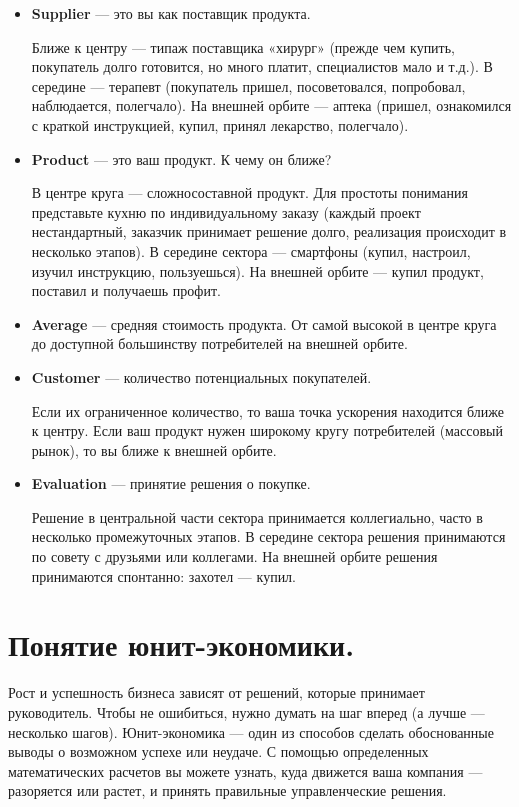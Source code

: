 \documentclass[11pt]{article}
\theoremstyle{plain} %
\theoremstyle{definition} %
\theoremstyle{remark} %
\begin{document}
\begin{itemize}
	\item \textbf{Supplier} --- это вы как поставщик продукта.

	Ближе к центру — типаж поставщика «хирург» (прежде чем купить, покупатель долго готовится, но много платит, специалистов мало и т.д.). В середине — терапевт (покупатель пришел, посоветовался, попробовал, наблюдается, полегчало). На внешней орбите — аптека (пришел, ознакомился с краткой инструкцией, купил, принял лекарство, полегчало).
	\item \textbf{Product} --- это ваш продукт. К чему он ближе?

	В центре круга — сложносоставной продукт. Для простоты понимания представьте кухню по индивидуальному заказу (каждый проект нестандартный, заказчик принимает решение долго, реализация происходит в несколько этапов). В середине сектора — смартфоны (купил, настроил, изучил инструкцию, пользуешься). На внешней орбите — купил продукт, поставил и получаешь профит.
	\item \textbf{Average} --- средняя стоимость продукта. От самой высокой в центре круга до доступной большинству потребителей на внешней орбите.
	\item \textbf{Customer} --- количество потенциальных покупателей.

	Если их ограниченное количество, то ваша точка ускорения находится ближе к центру. Если ваш продукт нужен широкому кругу потребителей (массовый рынок), то вы ближе к внешней орбите.
	\item \textbf{Evaluation} --- принятие решения о покупке.

	Решение в центральной части сектора принимается коллегиально, часто в несколько промежуточных этапов. В середине сектора решения принимаются по совету с друзьями или коллегами. На внешней орбите решения принимаются спонтанно: захотел — купил.
\end{itemize}

\newpage

\section{Понятие юнит-экономики.}\label{erste}

Рост и успешность бизнеса зависят от решений, которые принимает руководитель. Чтобы не ошибиться, нужно думать на шаг вперед (а лучше — несколько шагов). Юнит-экономика — один из способов сделать обоснованные выводы о возможном успехе или неудаче. С помощью определенных математических расчетов вы можете узнать, куда движется ваша компания — разоряется или растет, и принять правильные управленческие решения.
\end{document}
